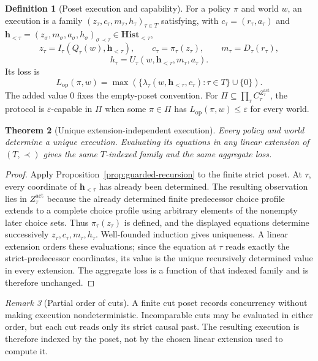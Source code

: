 \documentclass[11pt]{article}
\theoremstyle{plain}
\newtheorem{theorem}{Theorem}[section]
\theoremstyle{definition}
\newtheorem{definition}[theorem]{Definition}
\theoremstyle{remark}
\newtheorem{remark}[theorem]{Remark}
\newcommand{\eps}{\varepsilon}
\begin{document}
\begin{definition}[Poset execution and capability]
\label{def:operational-execution}
For a policy $\pi$ and world $w$, an execution is a family
$(z_\tau,c_\tau,m_\tau,h_\tau)_{\tau\in T}$ satisfying, with
$c_\tau=(r_\tau,a_\tau)$ and
$\mathbf h_{<\tau}=(z_\sigma,m_\sigma,a_\sigma,h_\sigma)_{\sigma\prec\tau}\in
\mathbf{Hist}_{<\tau}$,
\[
z_\tau=I_\tau(Q_\tau(w),\mathbf h_{<\tau}),
\qquad c_\tau=\pi_\tau(z_\tau),
\qquad m_\tau=D_\tau(r_\tau),
\]
\[
h_\tau=U_\tau(w,\mathbf h_{<\tau},m_\tau,a_\tau).
\]
Its loss is
\[
L_{\mathrm{op}}(\pi,w)
=\max\left(
\{\lambda_\tau(w,\mathbf h_{<\tau},c_\tau):\tau\in T\}
\cup\{0\}\right).
\]
The added value $0$ fixes the empty-poset convention.
For $\Pi\subseteq\prod_\tau C_\tau^{Z_\tau^{\mathrm{act}}}$, the protocol is
$\eps$-capable in $\Pi$ when some $\pi\in\Pi$ has
$L_{\mathrm{op}}(\pi,w)\le\eps$ for every world.
\end{definition}

\begin{theorem}[Unique extension-independent execution]
\label{thm:operational-execution}
Every policy and world determine a unique execution. Evaluating its equations in
any linear extension of $(T,\prec)$ gives the same $T$-indexed family and the
same aggregate loss.
\end{theorem}

\begin{proof}
Apply Proposition~\ref{prop:guarded-recursion} to the finite strict poset. At
$\tau$, every
coordinate of $\mathbf h_{<\tau}$ has already been determined. The resulting
observation lies in $Z_\tau^{\mathrm{act}}$ because the already determined finite
predecessor choice profile extends to a complete choice profile using arbitrary
elements of the nonempty later choice sets. Thus $\pi_\tau(z_\tau)$ is defined,
and the displayed equations determine successively $z_\tau,c_\tau,m_\tau,h_\tau$. Well-founded
induction gives uniqueness. A linear extension orders these evaluations;
since the equation at $\tau$ reads exactly the strict-predecessor coordinates,
its value is the unique recursively determined value in every extension. The
aggregate loss is a function of that indexed family and is therefore unchanged.
\end{proof}

\begin{remark}[Partial order of cuts]
A finite cut poset records concurrency without making execution nondeterministic.
Incomparable cuts may be evaluated in either order, but each cut reads only its
strict causal past. The resulting execution is therefore indexed by the poset,
not by the chosen linear extension used to compute it.
\end{remark}
\end{document}
